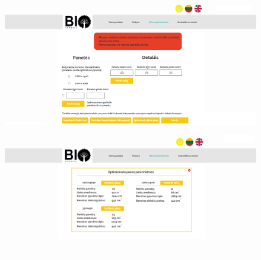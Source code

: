 \documentclass[a4paper,12pt]{article}
\begin{document}
\begin{figure}[!tph]
\hspace{-3cm}
\centering
\includegraphics[scale=0.5]{interfeisai/optimizavimoPuslapisPrisijungusSuKlaida}
\label{fig:verticalcell}
\end{figure}


\begin{figure}[!tph]
\hspace{-3cm}
\centering
\includegraphics[scale=0.5]{interfeisai/optimizavimoPuslapisOptimizuotiPlanai}
\label{fig:verticalcell}
\end{figure}
\clearpage
\end{document}
